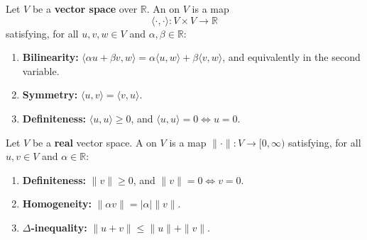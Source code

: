 \begin{definition}
\label{def:inner_product}
Let $V$ be a \textbf{vector space} over $\mathbb{R}$. An 
 on $V$ is a map
\[
\langle\cdot,\cdot\rangle : V \times V \to \mathbb{R}
\]
satisfying, for all $u, v, w \in V$ and $\alpha, \beta \in \mathbb{R}$:
\begin{enumerate}[label=\textbf{(\alph*)}]
  \item \textbf{Bilinearity:}
    $\langle \alpha u + \beta v, w\rangle = \alpha\langle u,w\rangle + \beta\langle v,w\rangle$,
    and equivalently in the second variable.
  \item \textbf{Symmetry:} $\langle u,v\rangle = \langle v,u\rangle$.
  \item \textbf{Definiteness:} $\langle u,u\rangle \geq 0$, and $\langle u,u\rangle = 0 \iff u = 0$.
\end{enumerate}
\end{definition}

\begin{definition}[Norm]
\label{def:norm}
Let $V$ be a \textbf{real} vector space. A   on $V$ is a map
$\|\cdot\| : V \to [0,\infty)$ satisfying, for all $u, v \in V$ and $\alpha \in \mathbb{R}$:
\begin{enumerate}[label=\textbf{(\alph*)}]
  \item \textbf{Definiteness:} $\|v\| \geq 0$, and $\|v\| = 0 \iff v = 0$.
  \item \textbf{Homogeneity:} $\|\alpha v\| = |\alpha|\|v\|$.
  \item \textbf{$\Delta$-inequality:} $\|u+v\| \leq \|u\| + \|v\|$.
\end{enumerate}
\end{definition}

